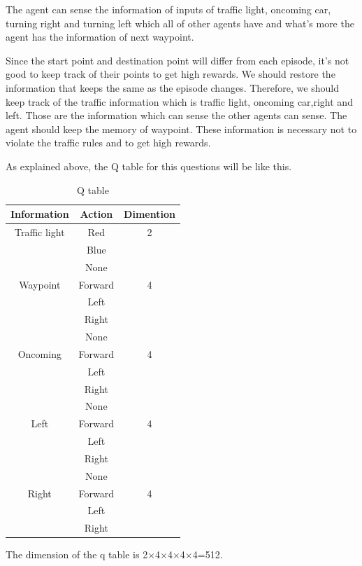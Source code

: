 \documentclass[a4paper,11pt]{article}
\begin{document}
The agent can sense the information of inputs of traffic light, oncoming car, turning right and turning left which all of other agents have and what's more the agent has the information of next waypoint.

Since the start point and destination point will differ from each episode, it's not good to keep track of their points to get high rewards.
We should restore the information that keeps the same as the episode changes. Therefore, we should keep track of the traffic information which is traffic light, oncoming car,right and left. Those are the information which can sense the other agents can sense. The agent should keep the memory of waypoint. These information is necessary not to violate the traffic rules and to get high rewards.

As explained above, the Q table for this questions will be like this.

\begin{table}[H]
\begin{center}
\caption{Q table}
\begin{tabular}{|c|c|c|} \hline
Information & Action & Dimention  \\ \hline
Traffic light & Red &2 \\ 
 & Blue & \\ \hline
 & None & \\
Waypoint &Forward &4\\
 &Left &\\
 & Right &\\ \hline
 & None & \\
 Oncoming&Forward &4\\
 &Left &\\
 & Right &\\ \hline
 & None & \\
 Left&Forward &4\\
 &Left &\\
 & Right &\\ \hline
 & None & \\
Right &Forward &4\\
 &Left &\\
 & Right &\\ \hline

\end{tabular}
\end{center}
\end{table}

The dimension of the q table is 2$\times$4$\times$4$\times$4$\times$4=512.
\end{document}
